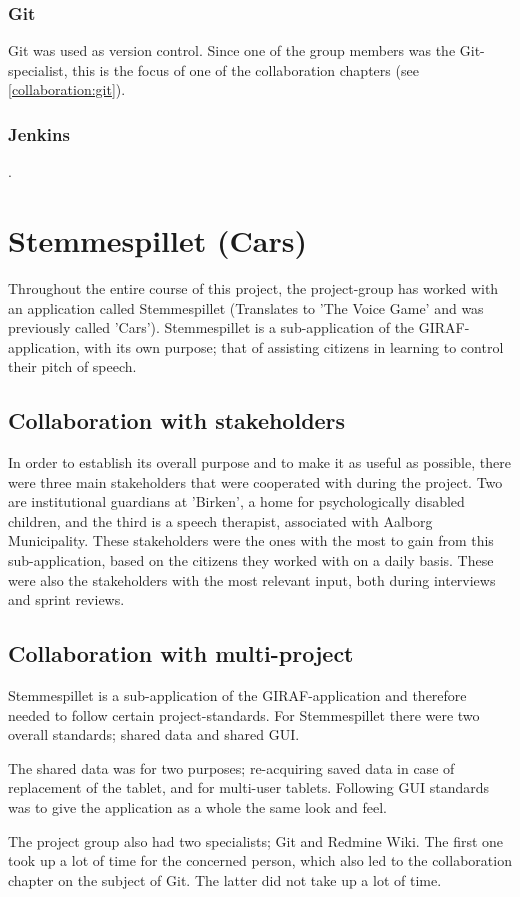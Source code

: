 \subsubsection{Git}
Git was used as version control.
Since one of the group members was the Git-specialist, this is the focus of one of the collaboration chapters (see \ref{collaboration:git}).

\subsubsection{Jenkins}
.

\section{Stemmespillet (Cars)}
Throughout the entire course of this project, the project-group has worked with an application called Stemmespillet (Translates to 'The Voice Game' and was previously called 'Cars').
Stemmespillet is a sub-application of the GIRAF-application, with its own purpose; that of assisting citizens in learning to control their pitch of speech.

\subsection{Collaboration with stakeholders}
In order to establish its overall purpose and to make it as useful as possible, there were three main stakeholders that were cooperated with during the project.
Two are institutional guardians at 'Birken', a home for psychologically disabled children, and the third is a speech therapist, associated with Aalborg Municipality.
These stakeholders were the ones with the most to gain from this sub-application, based on the citizens they worked with on a daily basis.
These were also the stakeholders with the most relevant input, both during interviews and sprint reviews.

\subsection{Collaboration with multi-project}
Stemmespillet is a sub-application of the GIRAF-application and therefore needed to follow certain project-standards.
For Stemmespillet there were two overall standards; shared data and shared GUI.

The shared data was for two purposes; re-acquiring saved data in case of replacement of the tablet, and for multi-user tablets.
Following GUI standards was to give the application as a whole the same look and feel.

The project group also had two specialists; Git and Redmine Wiki.
The first one took up a lot of time for the concerned person, which also led to the collaboration chapter on the subject of Git.
The latter did not take up a lot of time.